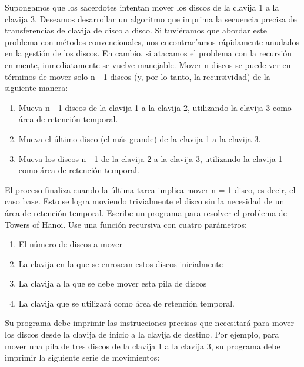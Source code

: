 Supongamos que los sacerdotes intentan mover los discos de la clavija 1 a la clavija 3. Deseamos desarrollar un algoritmo que imprima la secuencia precisa de transferencias de clavija de disco a disco.
Si tuviéramos que abordar este problema con métodos convencionales, nos encontraríamos rápidamente anudados en la gestión de los discos. En cambio, si atacamos el problema con la recursión en mente, inmediatamente se vuelve manejable. Mover n discos se puede ver en términos de mover solo n - 1 discos (y, por lo tanto, la recursividad) de la siguiente manera:
\begin{enumerate}
  \item Mueva n - 1 discos de la clavija 1 a la clavija 2, utilizando la clavija 3 como área de retención temporal.
  \item Mueva el último disco (el más grande) de la clavija 1 a la clavija 3.
  \item Mueva los discos n - 1 de la clavija 2 a la clavija 3, utilizando la clavija 1 como área de retención temporal.
\end{enumerate}
El proceso finaliza cuando la última tarea implica mover n = 1 disco, es decir, el caso base. Esto se logra moviendo trivialmente el disco sin la necesidad de un área de retención temporal.
Escribe un programa para resolver el problema de Towers of Hanoi. Use una función recursiva con cuatro parámetros:
\begin{enumerate}
  \item El número de discos a mover
  \item La clavija en la que se enroscan estos discos inicialmente
  \item La clavija a la que se debe mover esta pila de discos
  \item La clavija que se utilizará como área de retención temporal.
\end{enumerate}
Su programa debe imprimir las instrucciones precisas que necesitará para mover los discos desde la clavija de inicio a la clavija de destino. Por ejemplo, para mover una pila de tres discos de la clavija 1 a la clavija 3, su programa debe imprimir la siguiente serie de movimientos:

{\scriptsize
  \lstset{inputencoding=utf8/latin1}
  
}


